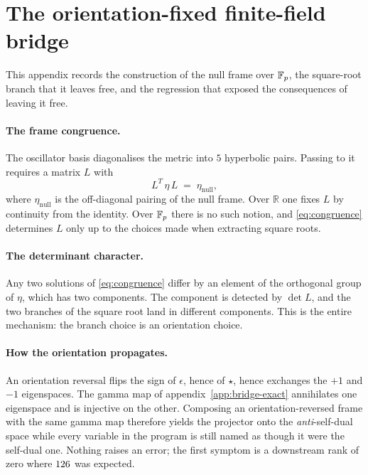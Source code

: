 \section{The orientation-fixed finite-field bridge}
\label{app:orientation}

This appendix records the construction of the null frame over $\mathbb{F}_p$, the
square-root branch that it leaves free, and the regression that exposed the
consequences of leaving it free.

\paragraph{The frame congruence.}
The oscillator basis diagonalises the metric into $5$ hyperbolic pairs. Passing
to it requires a matrix $L$ with
\begin{equation}
L^{T}\,\eta\,L \;=\; \eta_{\mathrm{null}},
\label{eq:congruence}
\end{equation}
where $\eta_{\mathrm{null}}$ is the off-diagonal pairing of the null frame. Over
$\mathbb{R}$ one fixes $L$ by continuity from the identity. Over $\mathbb{F}_p$ there is
no such notion, and \eqref{eq:congruence} determines $L$ only up to the choices
made when extracting square roots.

\paragraph{The determinant character.}
Any two solutions of \eqref{eq:congruence} differ by an element of the orthogonal
group of $\eta$, which has two components. The component is detected by
$\det L$, and the two branches of the square root land in different components.
This is the entire mechanism: the branch choice is an orientation choice.

\paragraph{How the orientation propagates.}
An orientation reversal flips the sign of $\epsilon$, hence of $\star$, hence
exchanges the $+1$ and $-1$ eigenspaces. The gamma map of
appendix~\ref{app:bridge-exact} annihilates one eigenspace and is injective on
the other. Composing an orientation-reversed frame with the same gamma map
therefore yields the projector onto the \emph{anti}-self-dual space while every
variable in the program is still named as though it were the self-dual one.
Nothing raises an error; the first symptom is a downstream rank of zero where
$126$ was expected.

